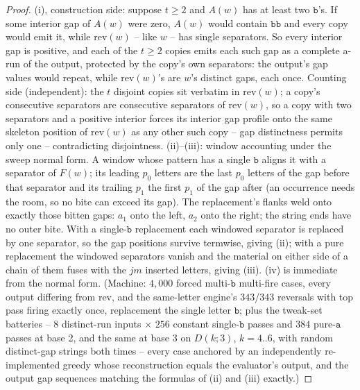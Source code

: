 \begin{proof}
    (i), construction side: suppose $t \ge 2$ and $A(w)$ has at least
    two $\mathtt b$'s.  If some interior gap of $A(w)$ were zero,
    $A(w)$ would contain $\mathtt{bb}$ and every copy would emit it,
    while $\mathrm{rev}(w)$ -- like $w$ -- has single separators.  So
    every interior gap is positive, and each of the $t \ge 2$ copies
    emits each such gap as a complete a-run of the output, protected
    by the copy's own separators: the output's gap values would
    repeat, while $\mathrm{rev}(w)$'s are $w$'s distinct gaps, each
    once.  Counting side (independent): the $t$ disjoint copies sit
    verbatim in $\mathrm{rev}(w)$; a copy's consecutive separators are
    consecutive separators of $\mathrm{rev}(w)$, so a copy with two
    separators and a positive interior forces its interior gap profile
    onto the same skeleton position of $\mathrm{rev}(w)$ as any other
    such copy -- gap distinctness permits only one -- contradicting
    disjointness.  (ii)--(iii): window accounting under the sweep
    normal form.  A window whose pattern has a single $\mathtt b$
    aligns it with a separator of $F(w)$; its leading $p_0$ letters
    are the last $p_0$ letters of the gap before that separator and its
    trailing $p_1$ the first $p_1$ of the gap after (an occurrence
    needs the room, so no bite can exceed its gap).  The replacement's
    flanks weld onto exactly those bitten gaps: $a_1$ onto the left,
    $a_2$ onto the right; the string ends have no outer bite.  With a
    single-$\mathtt b$ replacement each windowed separator is replaced
    by one separator, so the gap positions survive termwise, giving
    (ii); with a pure replacement the windowed separators vanish and
    the material on either side of a chain of them fuses with the
    $jm$ inserted letters, giving (iii).  (iv) is immediate from the
    normal form.  (Machine: $4{,}000$ forced multi-$\mathtt b$
    multi-fire cases, every output differing from $\mathrm{rev}$, and
    the same-letter engine's $343$/$343$ reversals with top pass firing
    exactly once, replacement the single letter $\mathtt b$; plus the
    tweak-set batteries -- $8$ distinct-run inputs $\times$ $256$
    constant single-$\mathtt b$ passes and $384$ pure-$\mathtt a$
    passes at base 2, and the same at base 3 on $D(k;3)$, $k = 4..6$,
    with random distinct-gap strings both times -- every case anchored
    by an independently re-implemented greedy whose reconstruction
    equals the evaluator's output, and the output gap sequences
    matching the formulas of (ii) and (iii) exactly.)
\end{proof}

